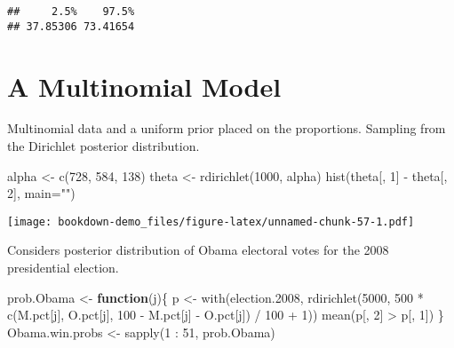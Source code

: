 \documentclass[
]{book}
\newenvironment{Shaded}{\begin{snugshade}}{\end{snugshade}}
\newcommand{\AttributeTok}[1]{\textcolor[rgb]{0.77,0.63,0.00}{#1}}
\newcommand{\ControlFlowTok}[1]{\textcolor[rgb]{0.13,0.29,0.53}{\textbf{#1}}}
\newcommand{\DecValTok}[1]{\textcolor[rgb]{0.00,0.00,0.81}{#1}}
\newcommand{\FloatTok}[1]{\textcolor[rgb]{0.00,0.00,0.81}{#1}}
\newcommand{\FunctionTok}[1]{\textcolor[rgb]{0.00,0.00,0.00}{#1}}
\newcommand{\NormalTok}[1]{#1}
\newcommand{\OtherTok}[1]{\textcolor[rgb]{0.56,0.35,0.01}{#1}}
\newcommand{\SpecialCharTok}[1]{\textcolor[rgb]{0.00,0.00,0.00}{#1}}
\newcommand{\StringTok}[1]{\textcolor[rgb]{0.31,0.60,0.02}{#1}}
\begin{document}
\begin{verbatim}
##     2.5%    97.5% 
## 37.85306 73.41654
\end{verbatim}

\hypertarget{a-multinomial-model}{%
\section{A Multinomial Model}\label{a-multinomial-model}}

Multinomial data and a uniform prior placed on the proportions. Sampling from the Dirichlet posterior distribution.

\begin{Shaded}
\begin{Highlighting}[]
\NormalTok{alpha }\OtherTok{\textless{}{-}} \FunctionTok{c}\NormalTok{(}\DecValTok{728}\NormalTok{, }\DecValTok{584}\NormalTok{, }\DecValTok{138}\NormalTok{)}
\NormalTok{theta }\OtherTok{\textless{}{-}} \FunctionTok{rdirichlet}\NormalTok{(}\DecValTok{1000}\NormalTok{, alpha)}
\FunctionTok{hist}\NormalTok{(theta[, }\DecValTok{1}\NormalTok{] }\SpecialCharTok{{-}}\NormalTok{ theta[, }\DecValTok{2}\NormalTok{], }\AttributeTok{main=}\StringTok{""}\NormalTok{)}
\end{Highlighting}
\end{Shaded}

\texttt{[image: bookdown-demo\_files/figure-latex/unnamed-chunk-57-1.pdf]}

Considers posterior distribution of Obama electoral votes for the 2008 presidential election.

\begin{Shaded}
\begin{Highlighting}[]
\NormalTok{prob.Obama }\OtherTok{\textless{}{-}} \ControlFlowTok{function}\NormalTok{(j)\{}
\NormalTok{  p }\OtherTok{\textless{}{-}} \FunctionTok{with}\NormalTok{(election}\FloatTok{.2008}\NormalTok{, }
            \FunctionTok{rdirichlet}\NormalTok{(}\DecValTok{5000}\NormalTok{,}
          \DecValTok{500} \SpecialCharTok{*} \FunctionTok{c}\NormalTok{(M.pct[j], O.pct[j], }
          \DecValTok{100} \SpecialCharTok{{-}}\NormalTok{ M.pct[j] }\SpecialCharTok{{-}}\NormalTok{ O.pct[j]) }\SpecialCharTok{/} \DecValTok{100} \SpecialCharTok{+} \DecValTok{1}\NormalTok{))}
  \FunctionTok{mean}\NormalTok{(p[, }\DecValTok{2}\NormalTok{] }\SpecialCharTok{\textgreater{}}\NormalTok{ p[, }\DecValTok{1}\NormalTok{])}
\NormalTok{\}}
\NormalTok{Obama.win.probs }\OtherTok{\textless{}{-}} \FunctionTok{sapply}\NormalTok{(}\DecValTok{1} \SpecialCharTok{:} \DecValTok{51}\NormalTok{, prob.Obama)}
\end{Highlighting}
\end{Shaded}
\end{document}
